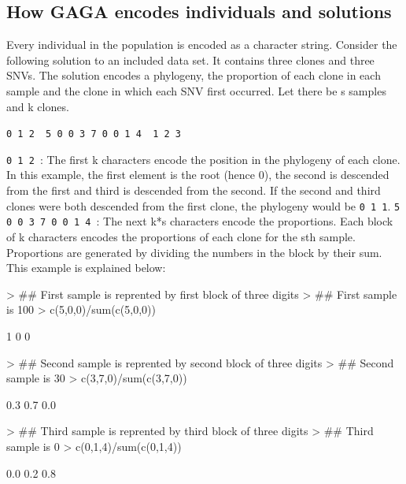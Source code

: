 \documentclass{article}
\begin{document}
\subsection{How GAGA encodes individuals and solutions}
Every individual in the population is encoded as a character string.  Consider the following solution to an included data set.  It contains three clones and three SNVs.  The solution encodes a phylogeny, the proportion of each clone in each sample and the clone in which each SNV first occurred.  Let there be {\color{icrpink}s} samples and {\color{icrred}k} clones.
\newline
\newline
{\raggedright{}\texttt{{\color{icrgreen}0  1  2 }{\color{icryellow} 5  0  0  3  7  0   0   1   4 }{\color{icrorange} 1   2   3 }}}
\newline
\newline
\texttt{{\color{icrgreen}0  1  2 }}: The first {\color{icrred}k} characters encode the position in the phylogeny of each clone.  In this example, the first element is the root (hence 0), the second is descended from the first and third is descended from the second.  If the second and third clones were both descended from the first clone, the phylogeny would be \texttt{0 1 1}.
\newline
\newline
\texttt{{\color{icryellow}5  0  0  3  7  0   0   1   4 }}: The next {\color{icrred}k}*{\color{icrpink}s} characters encode the proportions.  Each block of {\color{icrred}k} characters encodes the proportions of each clone for the {\color{icrpink}s}th sample.  Proportions are generated by dividing the numbers in the block by their sum.  This example is explained below:

\begin{Schunk}
\begin{Sinput}
> ## First sample is reprented by first block of three digits
> ## First sample is 100%
> c(5,0,0)/sum(c(5,0,0))
\end{Sinput}
\begin{Soutput}
[1] 1 0 0
\end{Soutput}
\begin{Sinput}
> ## Second sample is reprented by second block of three digits
> ## Second sample is 30%
> c(3,7,0)/sum(c(3,7,0))
\end{Sinput}
\begin{Soutput}
[1] 0.3 0.7 0.0
\end{Soutput}
\begin{Sinput}
> ## Third sample is reprented by third block of three digits
> ## Third sample is 0%
> c(0,1,4)/sum(c(0,1,4))
\end{Sinput}
\begin{Soutput}
[1] 0.0 0.2 0.8
\end{Soutput}
\end{Schunk}
\end{document}
